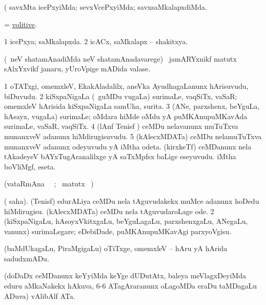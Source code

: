 \noindent 
\gl{\pagu}
\expl{}
\bmng
  (  savxMta icePxyiMda; sevxVcePxyiMda; savxsaMkalapxdiMda. 
\emng
\eentry

\bentry
{} 
\gl{\gu}
\expl{}
\bmng
 = \hyperlink{volitive}{volitive}. 
\emng
\eentry

\bentry 
{} 
\gl{\gu}
\expl{}
\bmng
\bnum
\num{1} icePxya; saMkalapxda. 
\num{2} icACx, saMkalapx -- shakitxya. 
\enum
\emng
\eentry

\bentry 
{} 
\gl{\nA}
\expl{\G}
\bmng
(\kirxsha\ neV shatamAnadiMda neV shatamAnadavarege) \kanmu\ jamARYxnikf matutx sAlxYxvikf janaru, yUroVpige mADida valase. 
\emng
\eentry

\bentry
{} 
\gl{\nA}
\bmng
\bnum
\num{1} oTATxgi, omemxleV, EkakAladalilx, aneVka AyudhagaLanunx hArisuvudu, biDuvudu. 
\num{2} kiSxpaNigaLa (\udA\ guMDu \mo vugaLa) surimaLe, vaqSiTx, vaSaR; omemxleV hArisida kiSxpaNigaLa samUha, surita. 
\num{3} (ANe, parxshenx, beYguLa, hAsayx, \mo vugaLa) surimaLe; oMdara hiMde oMdu yA puMKAnupuMKavAda surimaLe, vaSaR, vaqSiTx. 
\num{4} (lAnf Tenisf \mo) ceMDu nelavanunx muTuTxva munanxveV adanunx hiMdirugisuvudu. 
\num{5} (kAlecxMDATa) ceMDu nelamuTuTxva munanxveV adanunx odeyuvudu yA iMtha odeta. 
 (kirxkeTf) 
\banum
{} ceMDanunx nela tAkadeyeV bAYxTugAranalilxge yA saTxMpfsx baLige eseyuvudu. 
 iMtha boVliMgf, eseta. 
\eanum
\numie
\enum
\emng
\eentry

\bentry
{} 
\gl{\kirx} 
\bmng
(vataRmAna \parxpu\ \Eva\ ; \BU\ matutx \BUkaq\ )
\emng

\noindent
\gl{\sakirx}
\expl{}
\bmng
\bnum
{} ({\akirx} saha). 
\banum
{} (Tenisf) edurALiya ceMDu nela tAguvudakekx muMce adanunx hoDedu hiMdirugisu. 
 (kAlecxMDATa) ceMDu nela tAguvudaroLage ode. 
\eanum
\numie
\num{2} (kiSxpaNigaLu, hAsoyxVkitxgaLu, beYguLagaLu, parxshenxgaLu, ANegaLu, \mo vanunx) surimaLegare; eDebiDade, puMKAnupuMKavAgi parxyoVgisu. 
\enum
\emng

\noindent 
\gl{\akirx}
\expl{}
\bmng
 (baMdUkagaLu, PiraMgigaLu) oTiTxge, omemxleV -- hAru yA hArida sadudxmADu. 
\emng
\eentry

\bentry 
{} 
\gl{\nA}
\expl{}
\bmng
 (doDaDx ceMDanunx keYyiMda keYge dUDutAtx, baleya meVlagxDeyiMda eduru aMkaNakekx hAkuva, 6-6 ATagAraranunx oLagoMDa eraDu taMDagaLu ADuva) vAlibAlf ATa. 
\emng
\eentry

